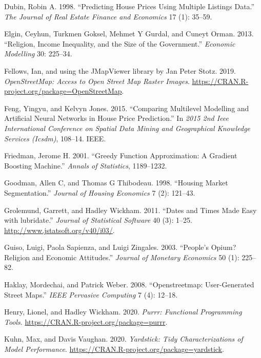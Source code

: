 \documentclass[conference,final,]{IEEEtran}
\begin{document}
\leavevmode\hypertarget{ref-dubin1998predicting}{}%
Dubin, Robin A. 1998. ``Predicting House Prices Using Multiple Listings Data.'' \emph{The Journal of Real Estate Finance and Economics} 17 (1): 35--59.

\leavevmode\hypertarget{ref-elgin2013religion}{}%
Elgin, Ceyhun, Turkmen Goksel, Mehmet Y Gurdal, and Cuneyt Orman. 2013. ``Religion, Income Inequality, and the Size of the Government.'' \emph{Economic Modelling} 30: 225--34.

\leavevmode\hypertarget{ref-R-OpenStreetMap}{}%
Fellows, Ian, and using the JMapViewer library by Jan Peter Stotz. 2019. \emph{OpenStreetMap: Access to Open Street Map Raster Images}. \url{https://CRAN.R-project.org/package=OpenStreetMap}.

\leavevmode\hypertarget{ref-feng2015comparing}{}%
Feng, Yingyu, and Kelvyn Jones. 2015. ``Comparing Multilevel Modelling and Artificial Neural Networks in House Price Prediction.'' In \emph{2015 2nd Ieee International Conference on Spatial Data Mining and Geographical Knowledge Services (Icsdm)}, 108--14. IEEE.

\leavevmode\hypertarget{ref-friedman2001greedy}{}%
Friedman, Jerome H. 2001. ``Greedy Function Approximation: A Gradient Boosting Machine.'' \emph{Annals of Statistics}, 1189--1232.

\leavevmode\hypertarget{ref-goodman1998housing}{}%
Goodman, Allen C, and Thomas G Thibodeau. 1998. ``Housing Market Segmentation.'' \emph{Journal of Housing Economics} 7 (2): 121--43.

\leavevmode\hypertarget{ref-R-lubridate}{}%
Grolemund, Garrett, and Hadley Wickham. 2011. ``Dates and Times Made Easy with lubridate.'' \emph{Journal of Statistical Software} 40 (3): 1--25. \url{http://www.jstatsoft.org/v40/i03/}.

\leavevmode\hypertarget{ref-guiso2003people}{}%
Guiso, Luigi, Paola Sapienza, and Luigi Zingales. 2003. ``People's Opium? Religion and Economic Attitudes.'' \emph{Journal of Monetary Economics} 50 (1): 225--82.

\leavevmode\hypertarget{ref-haklay2008openstreetmap}{}%
Haklay, Mordechai, and Patrick Weber. 2008. ``Openstreetmap: User-Generated Street Maps.'' \emph{IEEE Pervasive Computing} 7 (4): 12--18.

\leavevmode\hypertarget{ref-R-purrr}{}%
Henry, Lionel, and Hadley Wickham. 2020. \emph{Purrr: Functional Programming Tools}. \url{https://CRAN.R-project.org/package=purrr}.

\leavevmode\hypertarget{ref-R-yardstick}{}%
Kuhn, Max, and Davis Vaughan. 2020. \emph{Yardstick: Tidy Characterizations of Model Performance}. \url{https://CRAN.R-project.org/package=yardstick}.
\end{document}
